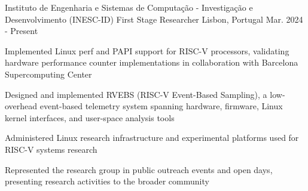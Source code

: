 
\begin{cventries}

  \cventry
  {Instituto de Engenharia e Sistemas de Computação - Investigação e Desenvolvimento (INESC-ID)}
  {First Stage Researcher}
  {Lisbon, Portugal}
  {Mar. 2024 - Present}
  {
    \begin{cvitems}
      \item Implemented Linux perf and PAPI support for RISC-V processors, validating hardware performance counter implementations in collaboration with Barcelona Supercomputing Center
      \item Designed and implemented RVEBS (RISC-V Event-Based Sampling), a low-overhead event-based telemetry system spanning hardware, firmware, Linux kernel interfaces, and user-space analysis tools
      \item Administered Linux research infrastructure and experimental platforms used for RISC-V systems research
      \item Represented the research group in public outreach events and open days, presenting research activities to the broader community
    \end{cvitems}
    \vspace{1em}
  }

\end{cventries}
